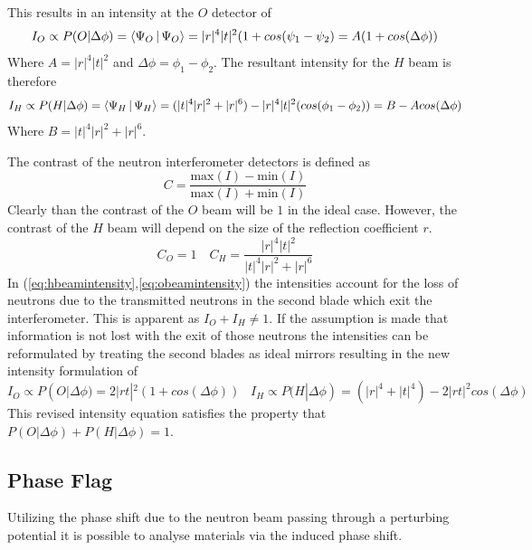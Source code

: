 This results in an intensity at the $O$ detector of\cite{dimaThesis}
\begin{equation}
I_O \propto P(O|\Delta\phi) = \Braket{\Psi_O | \Psi_O} = |r|^4|t|^2(1+cos(\psi_1-\psi_2) = A(1+cos(\Delta\phi))
\label{eq:obeamintensity}
\end{equation} 
Where $A=|r|^4|t|^2$ and $\Delta\phi = \phi_1-\phi_2$. The resultant intensity for the $H$ beam is therefore 
\begin{equation}
I_H \propto P(H|\Delta\phi) = \Braket{\Psi_H | \Psi_H} = (|t|^4|r|^2 + |r|^6)-|r|^4|t|^2(cos(\phi_1-\phi_2)) = B - Acos(\Delta\phi)
\label{eq:hbeamintensity}
\end{equation}
Where $B=|t|^4|r|^2 + |r|^6$. 

The contrast of the neutron interferometer detectors is defined as 
\begin{equation}
C = \frac{\text{max}(I)-\text{min}(I)}{\text{max}(I)+\text{min}(I)}
\label{eq:contrastdefinition}
\end{equation}
Clearly than the contrast of the $O$ beam will be $1$ in the ideal case. However, the contrast of the $H$ beam will depend on the size of the reflection coefficient $r$. 
\begin{equation}
C_O = 1 \,\,\,\,\,\, C_H = \frac{|r|^4|t|^2}{|t|^4|r|^2+|r|^6}
\label{eq:contrasts}
\end{equation}
In (\ref{eq:hbeamintensity},\ref{eq:obeamintensity}) the intensities account for the loss of neutrons due to the transmitted neutrons in the second blade which exit the interferometer. This is apparent as 
$I_O+I_H \neq 1$. If the assumption is made that information is not lost with the exit of those neutrons the intensities can be reformulated by treating the second blades as ideal mirrors resulting in the new intensity formulation of\cite{dimaThesis}
\begin{equation}
I_O \propto P(O|\Delta\phi) = 2|rt|^2(1+cos(\Delta\phi)) \,\,\,\,\, I_H \propto P(H|\Delta\phi) = (|r|^4+|t|^4)-2|rt|^2cos(\Delta\phi)
\label{eq:normalizedIntensities}
\end{equation}
This revised intensity equation satisfies the property that $P(O|\Delta\phi)+P(H|\Delta\phi) = 1$. 
\subsection{Phase Flag}
\label{sec:phaseflag}
Utilizing the phase shift due to the neutron beam passing through a perturbing potential it is possible to analyse materials via the induced phase shift. 

